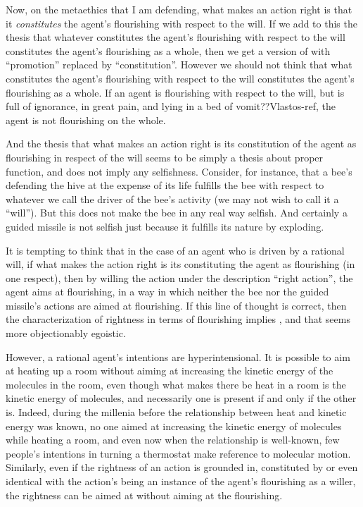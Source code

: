 Now, on the metaethics that I am defending, what makes an action right is that it \textit{constitutes} the agent's 
flourishing with respect to the will. If we add to this the thesis that whatever constitutes the agent's flourishing
with respect to the will constitutes the agent's flourishing as a whole, then we get a version of 
with ``promotion'' replaced by ``constitution''. However we should not think that what constitutes the agent's
flourishing with respect to the will constitutes the agent's flourishing as a whole. If an agent is flourishing with
respect to the will, but is full of ignorance, in great pain, and lying in a bed of vomit??Vlastos-ref, the agent
is not flourishing on the whole. 

And the thesis that what makes an action right is its constitution of the agent as flourishing in respect of the will
seems to be simply a thesis about proper function, and does not imply any selfishness. Consider, for instance, that a 
bee's defending the hive at the expense of its life fulfills the bee with respect to whatever we call the driver of 
the bee's activity (we may not wish to call it a ``will''). But this does not make the bee in any real way selfish. 
And certainly a guided missile is not selfish just because it fulfills its nature by exploding.

It is tempting to think that in the case of an agent who is driven by a rational will, if what makes the action 
right is its constituting the agent as flourishing (in one respect), then by willing the action under the
description ``right action'', the agent aims at flourishing, in a way in which neither the bee nor the guided missile's
actions are aimed at flourishing. If this line of thought is correct, then the characterization of rightness in terms of 
flourishing implies , and that seems more objectionably egoistic.

However, a rational agent's intentions are hyperintensional. It is possible to aim at heating up a room without aiming
at increasing the kinetic energy of the molecules in the room, even though what makes there be heat in a room is the
kinetic energy of molecules, and necessarily one is present if and only if the other is. Indeed, during the millenia 
before the relationship between heat and kinetic energy was known, no one aimed at increasing the kinetic energy of 
molecules while heating a room, and even now when the relationship is well-known, few people's intentions in turning 
a thermostat make reference to molecular motion. Similarly, even if the rightness of an action is grounded in, constituted 
by or even identical with the action's being an instance of the agent's flourishing as a willer, the rightness can be 
aimed at without aiming at the flourishing.

